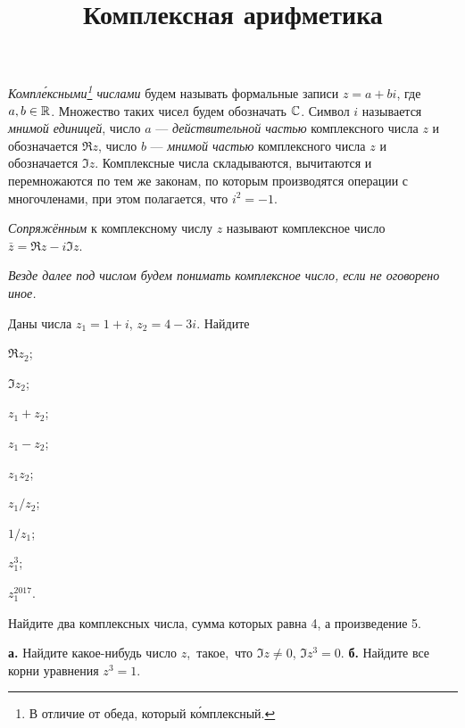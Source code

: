 \documentclass[a4paper, 12pt, num=21]{listok}
\begin{document}
\title{Комплексная арифметика}
\maketitle{}
\begin{definition}
	\textit{Компл\'ексными\footnote{В отличие от обеда, который к\'омплексный.} числами} будем называть формальные записи $z = a + b i$, где $a, b \in \mathbb{R}$.
	Множество таких чисел будем обозначать $\mathbb{C}$.
	Символ $i$ называется \textit{мнимой единицей}, число $a$ --- \textit{действительной частью} комплексного числа $z$ и обозначается $\Re z$,
	число $b$ --- \textit{мнимой частью} комплексного числа $z$ и обозначается $\Im z$.
	Комплексные числа складываются, вычитаются и перемножаются по тем же законам, по которым производятся операции с
	многочленами, при этом полагается, что $i^2 = -1$.
\end{definition}
\begin{definition}
	\textit{Сопряжённым} к комплексному числу $z$ называют комплексное число $\bar{z} = \Re z - i \Im z$.
\end{definition}
\textit{Везде далее под числом будем понимать комплексное число, если не оговорено иное.}
\begin{problem}
Даны числа $z_1 = 1 + i$, $z_2 = 4 - 3i$.
Найдите
\begin{enumerate}
\begin{multicols}{5}
	\item $\Re z_2$;
	\item $\Im z_2$;
	\item $z_1 + z_2$;
	\item $z_1 - z_2$;
	\item $z_1z_2$;
	\item $z_1/z_2$;
	\item $1/z_1$;
	\item $z_1^3$;
	\item $z_1^{2017}$.
\end{multicols}
\end{enumerate}
\end{problem}
\begin{problem}
	Найдите два комплексных числа, сумма которых равна 4, а произведение 5.
\end{problem}
\begin{problem}
	\textbf{а.} Найдите какое-нибудь число $z$,~такое,~что $\Im z \ne 0$, $\Im z^3 = 0$.
	\textbf{б.} Найдите все корни уравнения $z^3 = 1$.
\end{problem}
\end{document}
